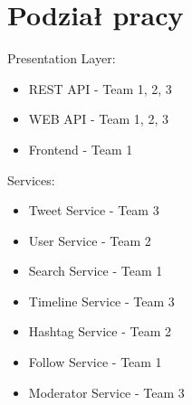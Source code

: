 \documentclass[a4paper]{article}
\begin{document}
\section{Podział pracy}

Presentation Layer:

\begin{itemize}
\item {REST API - Team 1, 2, 3}
\item {WEB API - Team 1, 2, 3}
\item {Frontend - Team 1}
\end{itemize}

Services:

\begin{itemize}
\item {Tweet Service - Team 3}
\item {User Service - Team 2 }
\item {Search Service - Team 1}
\item {Timeline Service - Team 3}
\item {Hashtag Service - Team 2}
\item {Follow Service - Team 1}
\item {Moderator Service - Team 3}
\end{itemize}
\end{document}
